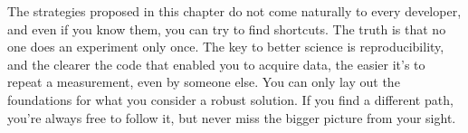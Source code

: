 The strategies proposed in this chapter do not come naturally to every developer, and even if you know them, you can try to find shortcuts. The truth is that no one does an experiment only once. The key to better science is reproducibility, and the clearer the code that enabled you to acquire data, the easier it's to repeat a measurement, even by someone else. You can only lay out the foundations for what you consider a robust solution. If you find a different path, you're always free to follow it, but never miss the bigger picture from your sight.
